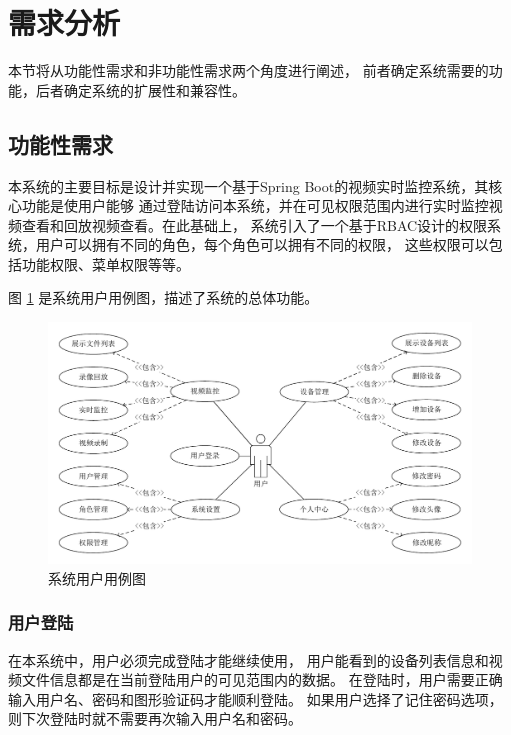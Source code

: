 \section{需求分析}


本节将从功能性需求和非功能性需求两个角度进行阐述\cite{刘意凡0基于}，
前者确定系统需要的功能，后者确定系统的扩展性和兼容性。

\subsection{功能性需求}
本系统的主要目标是设计并实现一个基于Spring Boot的视频实时监控系统，其核心功能是使用户能够
通过登陆访问本系统，并在可见权限范围内进行实时监控视频查看和回放视频查看。在此基础上，
系统引入了一个基于RBAC设计的权限系统，用户可以拥有不同的角色，每个角色可以拥有不同的权限，
这些权限可以包括功能权限、菜单权限等等。

图 \ref{Fig:case} 是系统用户用例图，描述了系统的总体功能。
\begin{figure}[ht]
    \centering   
    \includegraphics[width=1\linewidth]{./Figure/IMG_case.pdf}
    \caption{系统用户用例图}\label{Fig:case}
\end{figure}

\subsubsection{用户登陆}
在本系统中，用户必须完成登陆才能继续使用，
用户能看到的设备列表信息和视频文件信息都是在当前登陆用户的可见范围内的数据。
在登陆时，用户需要正确输入用户名、密码和图形验证码才能顺利登陆。
如果用户选择了记住密码选项，则下次登陆时就不需要再次输入用户名和密码。

